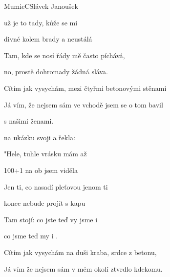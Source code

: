 \begin{song}{Mumie}{C}{Slávek Janoušek}

\begin{SBVerse}

 už je to tady, kůže se mi 

divné  kolem brady a neustálá 

Tam, kde se nosí řády mě často píchává,

no, prostě dohromady žádná sláva.

\end{SBVerse}

\begin{SBVerse}

Cítím jak vysychám, mezi čtyřmi betonovými stěnami

Já vím, že nejsem sám ve vchodě jsem se o tom bavil

s našimi ženami.

\end{SBVerse}

\begin{SBChorus*}

 na ukázku  svoji   a řekla:

"Hele,  tuhle vrásku  mám až  

 100+1 na ob jsem viděla  

Jen ti, co  nasadí pleťovou  jenom ti  

 konec  nebude   projít  s kapu

\end{SBChorus*}
\begin{SBChorus}

Tam stojí:  co jste teď vy  jsme i 

 co jsme teď my  i . 

\end{SBChorus}

\begin{SBVerse}

Cítím jak vysychám na duši kraba, srdce z betonu,

Já vím že nejsem sám v mém okolí ztvrdlo kdekomu.


\end{SBVerse}
\end{song}
